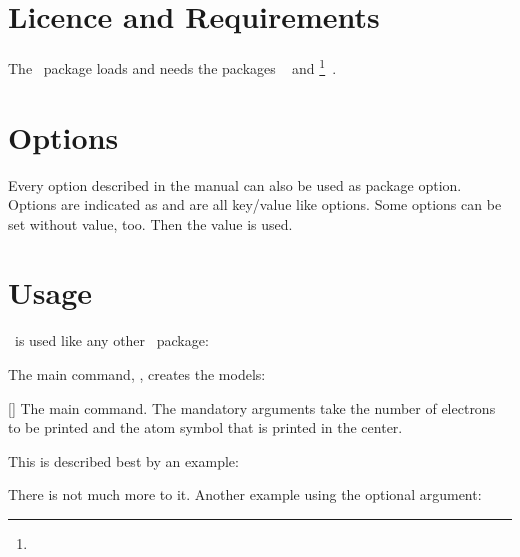 \documentclass[load-preamble+]{cnltx-doc}
\begin{document}
\section{Licence and Requirements}
\license

The \BOHR\ package loads and needs the packages
~\cite{pkg:pgf} and
\footnote{}~\cite{bnd:cnltx}.

\section{Options}
Every option described in the manual can also be used as package option.
Options are indicated as  and are all key/value like options.
Some options can be set without value, too.  Then the
 value is used.

\section{Usage}
\BOHR\ is used like any other \LaTeXe\ package:
\begin{sourcecode}
  \usepackage{bohr}
\end{sourcecode}

The main command, , creates the models:
\begin{commands}
 []
   The main command.  The mandatory arguments take the number of electrons to
   be printed and the atom symbol that is printed in the center.
\end{commands}

This is described best by an example:
\begin{example}
\end{example}
There is not much more to it.  Another example using the optional argument:
\begin{example}
\end{example}
\end{document}
